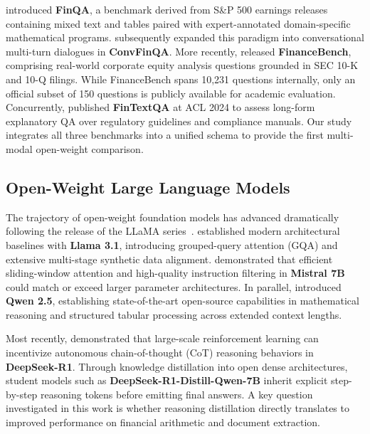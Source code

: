 \documentclass[11pt]{article}
\begin{document}
\citet{chen2021finqa} introduced \textbf{FinQA}, a benchmark derived from S\&P 500 earnings releases containing mixed text and tables paired with expert-annotated domain-specific mathematical programs. \citet{zheng2022convfinqa} subsequently expanded this paradigm into conversational multi-turn dialogues in \textbf{ConvFinQA}. More recently, \citet{islam2023financebench} released \textbf{FinanceBench}, comprising real-world corporate equity analysis questions grounded in SEC 10-K and 10-Q filings. While FinanceBench spans 10,231 questions internally, only an official subset of 150 questions is publicly available for academic evaluation. Concurrently, \citet{chen2024fintextqa} published \textbf{FinTextQA} at ACL 2024 to assess long-form explanatory QA over regulatory guidelines and compliance manuals. Our study integrates all three benchmarks into a unified schema to provide the first multi-modal open-weight comparison.

\subsection{Open-Weight Large Language Models}
The trajectory of open-weight foundation models has advanced dramatically following the release of the LLaMA series~\citep{touvron2023llama2}. \citet{meta2024llama3} established modern architectural baselines with \textbf{Llama 3.1}, introducing grouped-query attention (GQA) and extensive multi-stage synthetic data alignment. \citet{jiang2023mistral} demonstrated that efficient sliding-window attention and high-quality instruction filtering in \textbf{Mistral 7B} could match or exceed larger parameter architectures. In parallel, \citet{yang2024qwen25} introduced \textbf{Qwen 2.5}, establishing state-of-the-art open-source capabilities in mathematical reasoning and structured tabular processing across extended context lengths.

Most recently, \citet{deepseek2025r1} demonstrated that large-scale reinforcement learning can incentivize autonomous chain-of-thought (CoT) reasoning behaviors in \textbf{DeepSeek-R1}. Through knowledge distillation into open dense architectures, student models such as \textbf{DeepSeek-R1-Distill-Qwen-7B} inherit explicit step-by-step reasoning tokens before emitting final answers. A key question investigated in this work is whether reasoning distillation directly translates to improved performance on financial arithmetic and document extraction.
\end{document}
